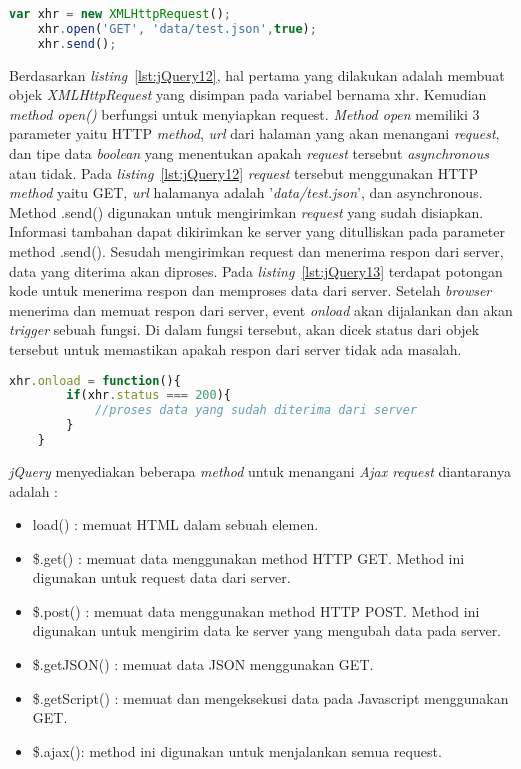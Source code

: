 \begin{lstlisting}[language=Javascript, caption=Membuat \textit{Ajax request} , label={lst:jQuery12}]
	var xhr = new XMLHttpRequest();
	xhr.open('GET', 'data/test.json',true);
	xhr.send();
\end{lstlisting}

Berdasarkan \textit{listing}~\ref{lst:jQuery12}, hal pertama yang dilakukan adalah membuat objek \textit{XMLHttpRequest} yang disimpan pada variabel bernama xhr. Kemudian \textit{method open()} berfungsi untuk menyiapkan request. \textit{Method open} memiliki 3 parameter yaitu HTTP \textit{method}, \textit{url} dari halaman yang akan menangani \textit{request}, dan tipe data \textit{boolean} yang menentukan apakah \textit{request} tersebut \textit{asynchronous} atau tidak. Pada \textit{listing}~\ref{lst:jQuery12} \textit{request} tersebut menggunakan HTTP \textit{method} yaitu GET, \textit{url} halamanya adalah '\textit{data/test.json}', dan asynchronous. Method .send() digunakan untuk mengirimkan \textit{request} yang sudah disiapkan. Informasi tambahan dapat dikirimkan ke server yang ditulliskan pada parameter method .send(). Sesudah mengirimkan request dan menerima respon dari server, data yang diterima akan diproses. Pada \textit{listing}~\ref{lst:jQuery13} terdapat potongan kode untuk menerima respon dan memproses data dari server. Setelah \textit{browser} menerima dan memuat respon dari server, event \textit{onload} akan dijalankan dan akan \textit{trigger} sebuah fungsi. Di dalam fungsi tersebut, akan dicek status dari objek tersebut untuk memastikan apakah respon dari server tidak ada masalah. 

\begin{lstlisting}[language=Javascript, caption=Memproses respon yang didapat dari server, label={lst:jQuery13}]
	xhr.onload = function(){
		if(xhr.status === 200){
			//proses data yang sudah diterima dari server
		}
	}
\end{lstlisting}

\textit{jQuery} menyediakan beberapa \textit{method} untuk menangani \textit{Ajax request} diantaranya adalah :

\begin{itemize}
	\item load() : memuat HTML dalam sebuah elemen.
	\item \$.get() : memuat data menggunakan method HTTP GET. Method ini digunakan untuk request data dari server.
	\item \$.post() : memuat data menggunakan method HTTP POST. Method ini digunakan untuk mengirim data ke server yang mengubah data pada server.
	\item \$.getJSON() : memuat data JSON menggunakan GET. 
	\item \$.getScript() : memuat dan mengeksekusi data pada Javascript menggunakan GET.
	\item \$.ajax(): method ini digunakan untuk menjalankan semua request. 
\end{itemize}

